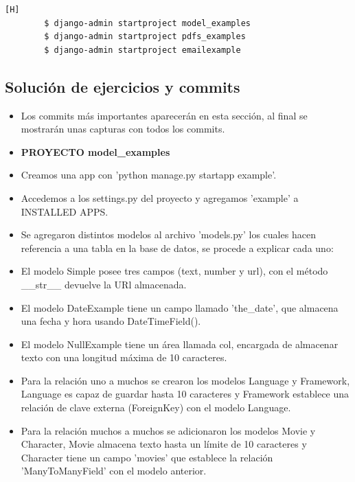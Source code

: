 \documentclass{article}
\begin{document}
        \begin{lstlisting}[language=bash,caption={Creando tres proyectos Django para las tres actividades.}][H]
        $ django-admin startproject model_examples
        $ django-admin startproject pdfs_examples
        $ django-admin startproject emailexample
	\end{lstlisting}

        \subsection{Solución de ejercicios y commits}
        \begin{itemize}	
		\item Los commits más importantes aparecerán en esta sección, al final se mostrarán unas capturas con todos los commits.
		\item \textbf{PROYECTO model\_examples}
            \item Creamos una app con 'python manage.py startapp example'.
            \item Accedemos a los settings.py del proyecto y agregamos 'example' a INSTALLED APPS.
            \item Se agregaron distintos modelos al archivo 'models.py' los cuales hacen referencia a una tabla en la base de datos, se procede a explicar cada uno:
            \item El modelo Simple posee tres campos (text, number y url), con el método \_\_str\_\_ devuelve la URl almacenada.
            \item El modelo DateExample  tiene un campo llamado 'the\_date', que almacena una fecha y hora usando DateTimeField().
            \item El modelo NullExample tiene un área llamada col, encargada de almacenar texto con una longitud máxima de 10 caracteres.
            \item Para la relación uno a muchos se crearon los modelos Language y Framework, Language es capaz de guardar hasta 10 caracteres y Framework establece una relación de clave externa (ForeignKey) con el modelo Language.
            \item Para la relación muchos a muchos se adicionaron los modelos Movie y Character, Movie almacena texto hasta un límite de 10 caracteres y Character tiene un campo 'movies' que establece la relación 'ManyToManyField' con el modelo anterior. 
        \end{itemize}    
        
\end{document}
